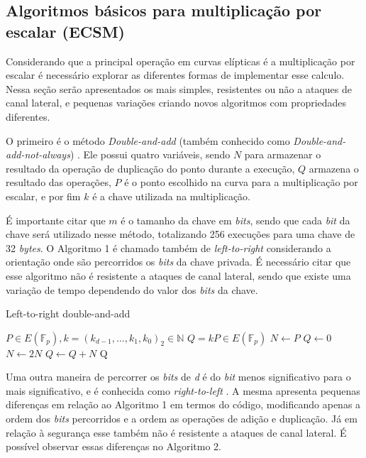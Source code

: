 \subsection{Algoritmos básicos para multiplicação por escalar (ECSM)}

Considerando que a principal operação em curvas elípticas é a multiplicação por escalar é necessário explorar as diferentes formas de implementar esse calculo. Nessa seção serão apresentados os mais simples, resistentes ou não a ataques de canal lateral, e pequenas variações criando novos algoritmos com propriedades diferentes.

O primeiro é o método \textit{Double-and-add} (também conhecido como \textit{Double-and-add-not-always}) \cite{DBLP:journals/iacr/Rivain11}. Ele possui quatro variáveis, sendo $N$ para armazenar o resultado da operação de duplicação do ponto durante a execução, $Q$ armazena o resultado das operações, $P$ é o ponto escolhido na curva para a multiplicação por escalar, e por fim $k$ é a chave utilizada na multiplicação.

É importante citar que $m$ é o tamanho da chave em \emph{bits}, sendo que cada \textit{bit} da chave será utilizado nesse método, totalizando 256 execuções para uma chave de 32 \textit{bytes}. O Algoritmo 1 é chamado também de \textit{left-to-right} considerando a orientação onde são percorridos os \textit{bits} da chave privada. É necessário citar que esse algoritmo não é resistente a ataques de canal lateral, sendo que existe uma variação de tempo dependendo do valor dos \emph{bits} da chave.

\begin{algorithm}
\caption{Left-to-right double-and-add}
\begin{algorithmic} 
    \REQUIRE $P \in E(\mathbb{F}_p), k=(k_{d-1},\ldots,k_1,k_0)_2 \in \mathbb{N}$
    \ENSURE $Q = kP \in E(\mathbb{F}_p)$
    \STATE $N \leftarrow P$
    \STATE $Q \leftarrow 0$
        \STATE $N \leftarrow 2N$
            \STATE $Q \leftarrow Q+N$
        \ENDIF
    \ENDFOR
    \RETURN Q
    \end{algorithmic}
\end{algorithm}

Uma outra maneira de percorrer os \textit{bits} de \textit{d} é do \textit{bit} menos significativo para o  mais significativo, e é conhecida como \textit{right-to-left} \cite{DBLP:journals/iacr/Rivain11}. A mesma apresenta pequenas diferenças em relação ao Algoritmo 1 em termos do código, modificando apenas a ordem dos \textit{bits} percorridos e a ordem as operações de adição e duplicação. Já em relação à segurança esse também não é resistente a ataques de canal lateral. É possível observar essas diferenças no Algoritmo 2.

